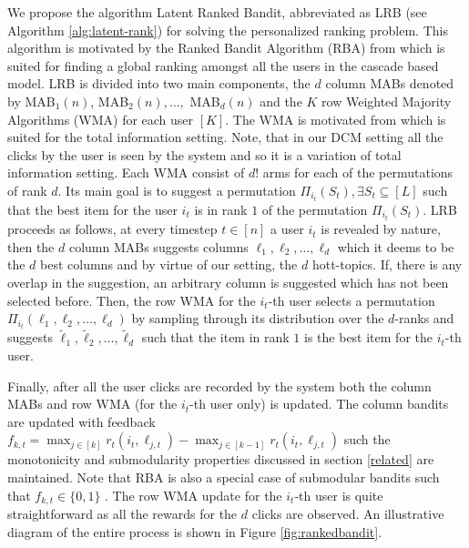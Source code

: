 We propose the algorithm Latent Ranked Bandit, abbreviated as LRB (see Algorithm \ref{alg:latent-rank}) for solving the personalized ranking problem. This algorithm is motivated by the Ranked Bandit Algorithm (RBA) from \citet{radlinski2008learning} which is suited for finding a global ranking amongst all the users in the cascade based model. LRB is divided into two main components, the $d$ column MABs denoted by MAB$_1(n)$, MAB$_2(n), \dots,$ MAB$_d(n)$ and the $K$ row Weighted Majority Algorithms (WMA) for each user $[K]$. The WMA is motivated from \citet{littlestone1994weighted} which is suited for the total information setting. Note, that in our DCM setting all the clicks by the user is seen by the system and so it is a variation of total information setting. Each WMA consist of $d!$ arms for each of the permutations of rank $d$. Its main goal is to suggest a permutation $\Pi_{i_t}(S_t), \exists S_t \subseteq [L]$ such that the best item for the user $i_t$ is in rank $1$ of the permutation $\Pi_{i_t}(S_t)$.  LRB proceeds as follows, at every timestep $t\in[n]$ a user $i_t$ is revealed by nature, then the $d$ column MABs suggests columns ${\ell}_{1}, {\ell}_{2},\dots, {\ell}_{d}$ which it deems to be the $d$ best columns and by virtue of our setting, the $d$ hott-topics. If, there is any overlap in the suggestion, an arbitrary column is suggested which has not been selected before. Then, the row WMA for the $i_t$-th user selects a permutation $\Pi_{i_t}({\ell}_{1}, {\ell}_{2},\dots, {\ell}_{d})$ by sampling through its distribution over the $d$-ranks and suggests $\tilde{\ell}_{1}, \tilde{\ell}_{2},\dots, \tilde{\ell}_{d}$ such that the item in rank $1$ is the best item for the $i_t$-th user. 

Finally, after all the user clicks are recorded by the system both the column MABs and row WMA (for the $i_t$-th user only) is updated. The column bandits are updated with feedback $f_{k,t} = \max_{j\in [k]} r_t(i_t, \ell_{j,t}) - \max_{j\in [k-1]} r_t(i_t,\ell_{j,t})$ such the monotonicity and submodularity properties discussed in section \ref{related} are maintained. Note that RBA is also a special case of submodular bandits such that $f_{k,t}\in\lbrace 0, 1\rbrace$ \citep{streeter2009online}. The row WMA update for the $i_t$-th user is quite straightforward as all the rewards for the $d$ clicks are observed. An illustrative diagram of the entire process is shown in Figure \ref{fig:rankedbandit}.


